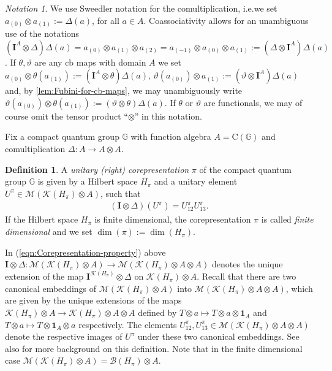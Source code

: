 \documentclass{amsart}
\theoremstyle{plain}
\theoremstyle{definition}
\newtheorem{definition}[theorem]{Definition}
\theoremstyle{remark}
\newtheorem{notation}[theorem]{Notation}
\begin{document}
	\begin{notation}
		We use Sweedler notation for the comultiplication, i.e.\@ we set $a_{(0)} \otimes a_{(1)} := \Delta(a)$, for all $a \in A$.
		Coassociativity allows for an unambiguous use of the notations $(\mathbf{I}^A \otimes \Delta)\Delta(a) = a_{(0)} \otimes a_{(1)} \otimes a_{(2)} = a_{(-1)} \otimes a_{(0)} \otimes a_{(1)} := (\Delta \otimes \mathbf{I}^A)\Delta(a)$.
		If $\theta, \vartheta$ are any cb maps with domain $A$ we set $a_{(0)} \otimes \theta(a_{(1)}) := (\mathbf{I}^A \otimes \theta) \Delta(a)$, $\vartheta(a_{(0)})\otimes a_{(1)} := (\vartheta \otimes \mathbf{I}^A) \Delta(a)$ and, by \autoref{lem:Fubini-for-cb-maps}, we may unambiguously write $\vartheta(a_{(0)}) \otimes \theta(a_{(1)}) := (\vartheta \otimes \theta) \Delta(a)$.
		If $\theta$ or $\vartheta$ are functionals, we may of course omit the tensor product ``$\otimes$'' in this notation.
	\end{notation}
	
	Fix a compact quantum group $\mathbb{G}$ with function algebra $A = \mathrm{C}(\mathbb{G})$ and comulti\-pli\-cation $\Delta : A \rightarrow A \otimes A$.
	
	\begin{definition}
		A \emph{unitary (right) corepresentation} $\pi$ of the compact quantum group $\mathbb{G}$ is given by a Hilbert space $H_\pi$ and a unitary element $U^\pi \in \mathcal{M}(\mathcal{K}(H_\pi) \otimes A)$, such that 
		\begin{align}\label{eqn:Corepresentation-property}
			(\mathbf{I} \otimes \Delta) (U^\pi) = U^\pi_{12} U^\pi_{13}.
		\end{align}
		If the Hilbert space $H_\pi$ is finite dimensional, the corepresentation $\pi$ is called \emph{finite dimensional} and we set $\dim(\pi) := \dim(H_\pi)$.
	\end{definition}
	
	In (\ref{eqn:Corepresentation-property}) above $\mathbf{I} \otimes \Delta : \mathcal{M}(\mathcal{K}(H_\pi) \otimes A) \rightarrow \mathcal{M}(\mathcal{K}(H_\pi) \otimes A \otimes A)$ denotes the unique extension of the map $\mathbf{I}^{\mathcal{K}(H_\pi)} \otimes \Delta$ on $\mathcal{K}(H_\pi) \otimes A$.
	Recall that there are two canonical embeddings of $\mathcal{M}(\mathcal{K}(H_\pi) \otimes A)$ into $\mathcal{M}(\mathcal{K}(H_\pi) \otimes A \otimes A)$, which are given by the unique extensions of the maps $\mathcal{K}(H_\pi) \otimes A \rightarrow \mathcal{K}(H_\pi) \otimes A \otimes A$ defined by $T \otimes a \mapsto T \otimes a \otimes \mathbf{1}_A$ and $T \otimes a \mapsto T \otimes \mathbf{1}_A \otimes a$ respectively.
	The elements $U^\pi_{12}, U^\pi_{13} \in \mathcal{M}(\mathcal{K}(H_\pi) \otimes A \otimes A)$ denote the respective images of $U^\pi$ under these two canonical embeddings.
	See also \cite{MVD98} for more background on this definition.
	Note that in the finite dimensional case $\mathcal{M}(\mathcal{K}(H_\pi) \otimes A) = \mathcal{B}(H_\pi) \otimes A$.
	
\end{document}
